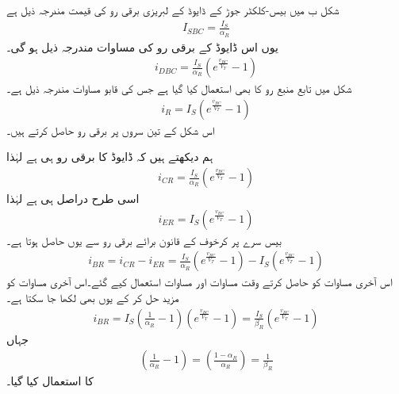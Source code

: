 شکل  ب میں بیس-کلکٹر جوڑ کے ڈایوڈ کے لبریزی برقی رو کی قیمت مندرجہ ذیل ہے
\begin{align}
I_{SBC}=\frac{I_S}{\alpha_R}
\end{align}
یوں اس ڈایوڈ کے برقی رو کی مساوات مندرجہ ذیل ہو گی۔
\begin{align}
i_{DBC}=\frac{I_S}{\alpha_R} \left(e^{\frac{v_{BC}}{V_T}}-1 \right )
\end{align}
شکل میں تابع منبع رو  کا بھی استعمال کیا گیا ہے جس کی قابو مساوات مندرجہ ذیل ہے۔
\begin{align}
i_R = I_S \left (e^{\frac{v_{BC}}{V_T}}-1 \right )
\end{align}
اس شکل کے تین سروں پر برقی رو حاصل کرتے ہیں۔

ہم دیکھتے ہیں کہ ڈایوڈ کا برقی رو ہی  ہے لہٰذا
\begin{align} \label{مساوات_ٹرانزسٹر_کلکٹر _الٹی_رو}
i_{CR}=\frac{I_S}{\alpha_R} \left (e^{\frac{v_{BC}}{V_T}}-1 \right )
\end{align}
اسی طرح   دراصل  ہی ہے لہٰذا
\begin{align} \label{مساوات_ٹرانزسٹر_مخارج_الٹی_رو}
i_{ER}=I_S \left (e^{\frac{v_{BC}}{V_T}}-1 \right )
\end{align}
بیس سرے پر کرخوف کے قانون برائے برقی رو سے  یوں حاصل ہوتا ہے۔
\begin{align} \label{مساوات_ٹرانزسٹر_قابو_الٹی_رو_الف}
i_{BR}=i_{CR}-i_{ER}=\frac{I_S}{\alpha_R} \left (e^{\frac{v_{BC}}{V_T}}-1 \right )-I_S \left (e^{\frac{v_{BC}}{V_T}}-1 \right )
\end{align}
اس آخری مساوات کو حاصل کرتے وقت مساوات   اور مساوات   استعمال کیے گئے۔اس آخری مساوات کو مزید حل کر کے یوں بھی لکھا جا سکتا ہے۔
\begin{align}
i_{BR}=I_S \left (\frac{1}{\alpha_R}-1 \right ) \left (e^{\frac{v_{BC}}{V_T}}-1 \right )=\frac{I_S}{\beta_R} \left (e^{\frac{v_{BC}}{V_T}}-1 \right )
\end{align}
جہاں
\begin{align}
\left (\frac{1}{\alpha_R}-1 \right )=\left (\frac{1-\alpha_R}{\alpha_R} \right )=\frac{1}{\beta_R}
\end{align}
کا استعمال کیا گیا۔

